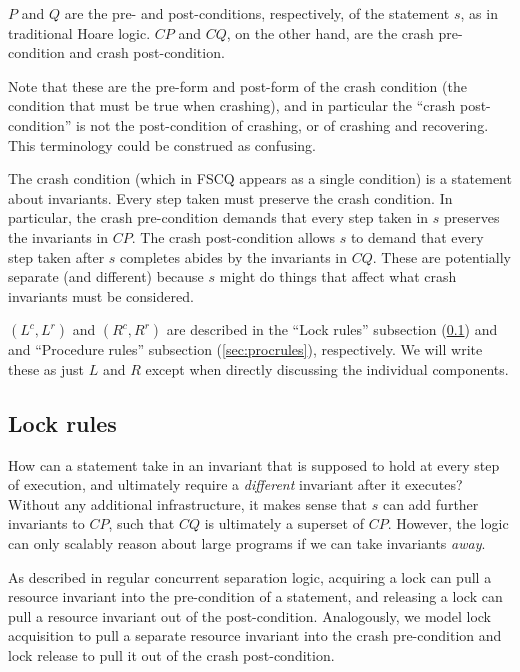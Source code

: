 $P$ and $Q$ are the pre- and post-conditions, respectively, of the statement
$s$, as in traditional Hoare logic.
$CP$ and $CQ$, on the other hand, are the
crash pre-condition and crash post-condition.

Note that these are the pre-form and post-form of the crash
condition (the condition that must be true when crashing), and in
particular the ``crash post-condition'' is not the post-condition of
crashing, or of crashing and recovering.
This terminology could be construed as confusing.

The crash condition (which in FSCQ appears as a single condition) is a
statement about invariants.
Every step taken must preserve the crash condition.
In particular, the crash pre-condition demands that every step taken
in $s$ preserves the invariants in $CP$.
The crash post-condition allows $s$ to demand that every step taken
after $s$ completes abides by the invariants in $CQ$.
These are potentially separate (and different) because $s$ might do
things that affect what crash invariants must be considered.

$(L^c,L^r)$ and $(R^c,R^r)$ are described in the ``Lock rules'' subsection
(\ref{sec:lockrules}) and and ``Procedure rules'' subsection
(\ref{sec:procrules}), respectively.
We will write these as just $L$ and $R$ except when directly
discussing the individual components.

\subsection{Lock rules}
\label{sec:lockrules}

How can a statement take in an invariant that is supposed to hold at every step
of execution, and ultimately require a \textit{different} invariant after it
executes? Without any additional infrastructure, it makes sense that $s$ can add
further invariants to $CP$, such that $CQ$ is ultimately a superset of $CP$.
However, the logic can only scalably reason about large programs if we can
take invariants \textit{away}.

As described in regular concurrent separation logic, acquiring a lock can pull a
resource invariant into the pre-condition of a statement, and releasing a lock
can pull a resource invariant out of the post-condition.
Analogously, we model
lock acquisition to pull a separate resource invariant into the crash
pre-condition and lock release to pull it out of the crash post-condition.

